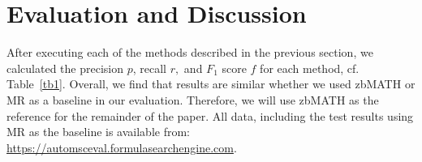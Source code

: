 \section{Evaluation and Discussion}\label{sec:eval}

After executing each of the methods described in the previous section, we calculated the precision \(p\), recall \(r,\) and \(F_{1}\) score \(f\) for each method, cf. Table~\ref{tb1}.
Overall, we find that results are similar whether we used zbMATH or MR as a baseline in our evaluation.
Therefore, we will use zbMATH as the reference for the remainder of the paper. All data, including the test results using MR as the baseline is available from: \url{https://automsceval.formulasearchengine.com}.


